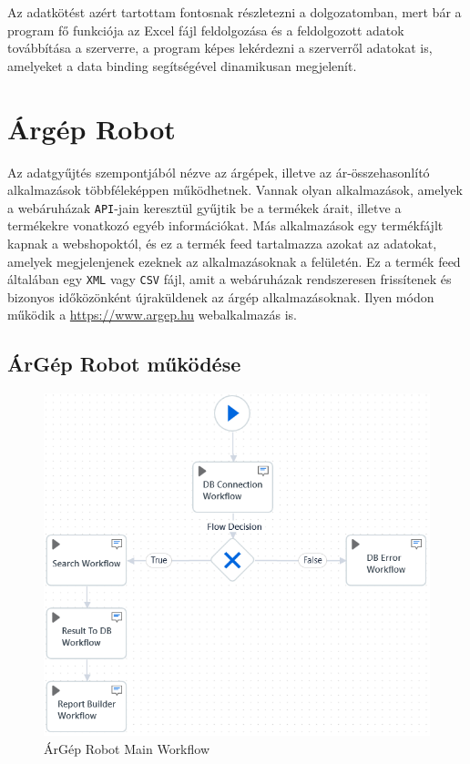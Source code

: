 \documentclass[
]{thesis-ekf}
\theoremstyle{definition}
\theoremstyle{remark}
\begin{document}

Az adatkötést azért tartottam fontosnak részletezni a dolgozatomban, mert bár a program fő funkciója az Excel fájl feldolgozása és a feldolgozott adatok továbbítása a szerverre, a program képes lekérdezni a szerverről adatokat is, amelyeket a data binding segítségével dinamikusan megjelenít.

\section{Árgép Robot}
Az adatgyűjtés szempontjából nézve az árgépek, illetve az ár-összehasonlító alkalmazások többféleképpen működhetnek. Vannak olyan alkalmazások, amelyek a webáruházak \texttt{API}-jain keresztül gyűjtik be a termékek árait, illetve a termékekre vonatkozó egyéb információkat. 
Más alkalmazások egy termékfájlt kapnak a webshopoktól, és ez a termék feed tartalmazza azokat az adatokat, amelyek megjelenjenek ezeknek az alkalmazásoknak a felületén. Ez a termék feed általában egy \texttt{XML} vagy \texttt{CSV} fájl, amit a webáruházak rendszeresen frissítenek és bizonyos időközönként újraküldenek az árgép alkalmazásoknak. Ilyen módon működik a \url{https://www.argep.hu} webalkalmazás is.

\subsection{ÁrGép Robot működése}

\begin{figure}[!ht]
	\centering
	\includegraphics[width=14cm]{mainWorkflow}
	\caption{ ÁrGép Robot Main Workflow}
	\label{picture-MainWorkFlow}
\end{figure}
\end{document}
